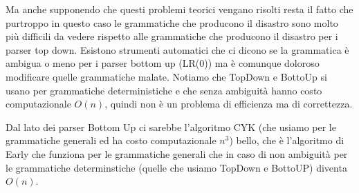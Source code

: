 Ma anche supponendo che questi problemi teorici vengano risolti resta il fatto che purtroppo in questo caso le grammatiche che producono il disastro sono molto più difficili da vedere rispetto alle grammatiche che producono il disastro per i parser top down. Esistono strumenti automatici che ci dicono se la grammatica è ambigua o meno per i parser bottom up (LR(0)) ma è comunque doloroso modificare quelle grammatiche malate. Notiamo che TopDown e BottoUp si usano per grammatiche deterministiche e che senza ambiguità hanno costo computazionale $O(n)$, quindi non è un problema di efficienza ma di correttezza. 

Dal lato dei parser Bottom Up ci sarebbe l'algoritmo CYK (che usiamo per le grammatiche generali ed ha costo computazionale $n^3$) bello, che è l'algoritmo di Early che funziona per le grammatiche generali che in caso di non ambiguità per le grammatiche determinstiche (quelle che usiamo TopDown e BottoUP) diventa $O(n)$.